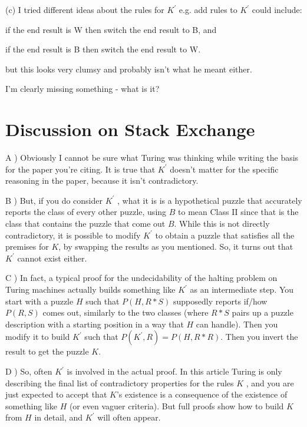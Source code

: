 \documentclass{article}[12pt]
\begin{document}
(c) I tried different ideas about the rules for $K^\prime$ e.g. add rules to $K^\prime$ could include:

\noindent
if the end result is W then switch the end result to B, and 

\noindent

if the end result is B then switch the end result to W.

\noindent

but this looks very clumsy and probably isn't what he meant either.

\noindent

I'm clearly missing something - what is it?

\noindent

\section*{Discussion on Stack Exchange}

\noindent

A ) Obviously I cannot be sure what Turing was thinking while writing the basis for the paper you're citing. It is true that $K^\prime$ 
doesn't matter for the specific reasoning in the paper, because it isn't contradictory.
\noindent

B ) But, if you do consider $K^\prime$ , what it is is a hypothetical puzzle that accurately reports the class of every other puzzle, using $B$
to mean Class II since that is the class that contains the puzzle that come out $B$. While this is not directly contradictory, it is possible to modify $K^\prime$  to obtain a puzzle that satisfies all the premises for $K$, by swapping the results as you mentioned. So, it turns out that $K^\prime$ 
cannot exist either.

\noindent

C ) In fact, a typical proof for the undecidability of the halting problem on Turing machines actually builds something like $K^\prime$ 
as an intermediate step. You start with a puzzle $H$ such that $P( H, R*S)$ supposedly reports if/how $P(R,S)$
comes out, similarly to the two classes (where $R*S$ pairs up a puzzle description with a starting position in a way that $H$
can handle). Then you modify it to build $K^\prime$  such that $P(K^\prime, R )=P (H, R*R )$. Then you invert the result to get the puzzle $K$.

\noindent

D )  So, often $K^\prime$  is involved in the actual proof. In this article Turing is only describing the final list of contradictory properties for the rules $K$
, and you are just expected to accept that $K$'s existence is a consequence of the existence of something like $H$ (or even vaguer criteria). But full proofs show how to build $K$ from $H$ in detail, and $K^\prime$  will often appear.
\end{document}
